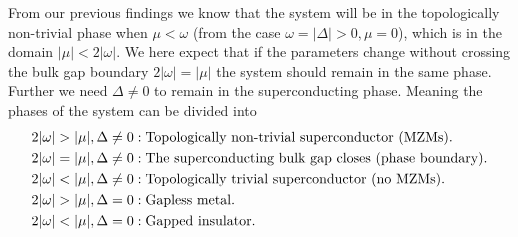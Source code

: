 From our previous findings we know that the system will be in the topologically non-trivial phase when $\mu < \omega$ (from the case $\omega = |\Delta| > 0, \mu = 0$), which is in the domain $|\mu| < 2|\omega|$. We here expect that if the parameters change without crossing the bulk gap boundary $2 |\omega| = |\mu|$ the system should remain in the same phase. Further we need $\Delta \neq 0$ to remain in the superconducting phase. Meaning the phases of the system can be divided into 
\begin{align}
    2|\omega| > |\mu|, \Delta \neq 0 &: \text{Topologically non-trivial superconductor (MZMs)}. \notag \\
    2|\omega| = |\mu|, \Delta \neq 0 &: \text{The superconducting bulk gap closes (phase boundary)}. \notag \\
    2|\omega| < |\mu|, \Delta \neq 0 &: \text{Topologically trivial superconductor (no MZMs)}.\notag \\
    2|\omega| > |\mu|, \Delta = 0 &: \text{Gapless metal}. \notag \\
    2|\omega| < |\mu|, \Delta = 0 &: \text{Gapped insulator}.\notag
\end{align}

